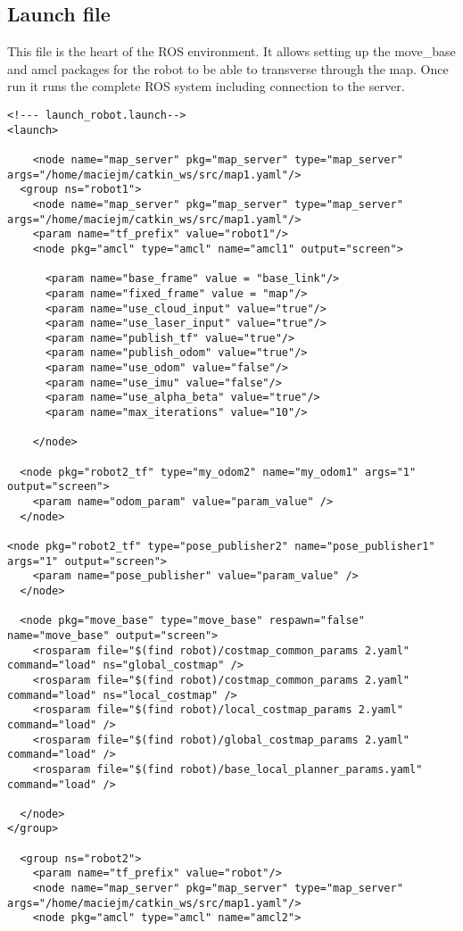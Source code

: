 \subsection{Launch file}
This file is the heart of the ROS environment. It allows setting up the move\_base and amcl packages for the robot to be able to transverse through the map. Once run it runs the complete ROS system including connection to the server.
\begin{lstlisting}
<!--- launch_robot.launch-->
<launch>
  
    <node name="map_server" pkg="map_server" type="map_server" args="/home/maciejm/catkin_ws/src/map1.yaml"/>
  <group ns="robot1">
    <node name="map_server" pkg="map_server" type="map_server" args="/home/maciejm/catkin_ws/src/map1.yaml"/>
    <param name="tf_prefix" value="robot1"/>
    <node pkg="amcl" type="amcl" name="amcl1" output="screen">

      <param name="base_frame" value = "base_link"/>
      <param name="fixed_frame" value = "map"/>
      <param name="use_cloud_input" value="true"/>
      <param name="use_laser_input" value="true"/>
      <param name="publish_tf" value="true"/>
      <param name="publish_odom" value="true"/>
      <param name="use_odom" value="false"/>
      <param name="use_imu" value="false"/>
      <param name="use_alpha_beta" value="true"/>
      <param name="max_iterations" value="10"/>

    </node>

  <node pkg="robot2_tf" type="my_odom2" name="my_odom1" args="1" output="screen">
    <param name="odom_param" value="param_value" />
  </node>

<node pkg="robot2_tf" type="pose_publisher2" name="pose_publisher1" args="1" output="screen">
    <param name="pose_publisher" value="param_value" />
  </node>

  <node pkg="move_base" type="move_base" respawn="false" name="move_base" output="screen">
    <rosparam file="$(find robot)/costmap_common_params 2.yaml" command="load" ns="global_costmap" />
    <rosparam file="$(find robot)/costmap_common_params 2.yaml" command="load" ns="local_costmap" />
    <rosparam file="$(find robot)/local_costmap_params 2.yaml" command="load" />
    <rosparam file="$(find robot)/global_costmap_params 2.yaml" command="load" />
    <rosparam file="$(find robot)/base_local_planner_params.yaml" command="load" />
    
  </node>
</group>
  
  <group ns="robot2">
    <param name="tf_prefix" value="robot"/>
    <node name="map_server" pkg="map_server" type="map_server" args="/home/maciejm/catkin_ws/src/map1.yaml"/>
    <node pkg="amcl" type="amcl" name="amcl2">


\end{lstlisting}
